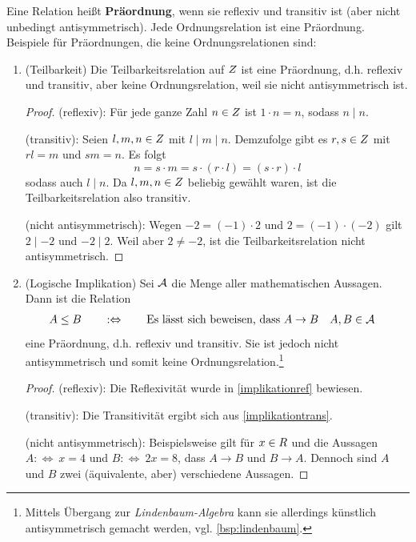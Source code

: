 \begin{bsp}[* Präordnungen] 
    Eine Relation heißt \textbf{Präordnung}, wenn sie reflexiv und transitiv ist (aber nicht unbedingt antisymmetrisch). Jede Ordnungsrelation ist eine Präordnung. Beispiele für Präordnungen, die keine Ordnungsrelationen sind:
    \begin{enumerate}
        \item(Teilbarkeit) Die Teilbarkeitsrelation auf $\relax Z$ ist eine Präordnung, d.h. reflexiv und transitiv, aber keine Ordnungsrelation, weil sie nicht antisymmetrisch ist.
        \begin{proof}
            (reflexiv): Für jede ganze Zahl $n\in \relax Z$ ist $1\cdot n=n$, sodass $n\mid n$.

            (transitiv): Seien $l,m,n\in \relax Z$ mit $l\mid m\mid n$. Demzufolge gibt es $r,s\in \relax Z$ mit $rl=m$ und $sm=n$. Es folgt
                \[ n = s\cdot m = s\cdot (r\cdot l) = (s\cdot r)\cdot l \]
                sodass auch $l\mid n$. Da $l,m,n\in\relax Z$ beliebig gewählt waren, ist die Teilbarkeitsrelation also transitiv.

            (nicht antisymmetrisch): Wegen $-2=(-1)\cdot 2$ und $2=(-1)\cdot (-2)$ gilt $2\mid -2$ und $-2\mid 2$. Weil aber $2\neq -2$, ist die Teilbarkeitsrelation nicht antisymmetrisch.
        \end{proof}
        \item(Logische Implikation) Sei $\mathcal A$ die Menge aller mathematischen Aussagen. Dann ist die Relation
        \begin{align*}
            A\le B \qquad &:\Leftrightarrow\qquad  \text{Es lässt sich beweisen, dass $A\to B$} && A,B\in \mathcal A
        \end{align*}
        eine Präordnung, d.h. reflexiv und transitiv. Sie ist jedoch nicht antisymmetrisch und somit keine Ordnungsrelation.\footnote{Mittels Übergang zur \emph{Lindenbaum-Algebra} kann sie allerdings künstlich antisymmetrisch gemacht werden, vgl. \cref{bsp:lindenbaum}.}
        \begin{proof}
            (reflexiv): Die Reflexivität wurde in \cref{implikationref} bewiesen.

            (transitiv): Die Transitivität ergibt sich aus \cref{implikationtrans}.

            (nicht antisymmetrisch): Beispielsweise gilt für $x\in\relax R$ und die Aussagen $A:\Leftrightarrow\ x=4$ und $B:\Leftrightarrow\ 2x=8$, dass $A\to B$ und $B\to A$. Dennoch sind $A$ und $B$ zwei (äquivalente, aber) verschiedene Aussagen.
        \end{proof}
    \end{enumerate}
\end{bsp}


